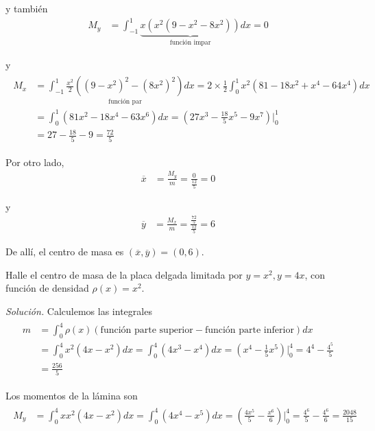 y también
\begin{align*}
M_{y}&=\int_{-1}^{1}\underset{\text{función impar}}{\underbrace{x\left(
x^{2}\left( 9-x^{2}-8x^{2}\right) \right) }}dx=0
\end{align*}

y
\begin{gather*}
\begin{aligned}
  M_{x}&=\int_{-1}^{1}\underset{\text{función par}}{\frac{x^{2}}{2}\left(
  \left( 9-x^{2}\right) ^{2}-\left( 8x^{2}\right) ^{2}\right) }dx=2\times \frac{1}{2}\int_{0}^{1}x^{2}\left( 81-18x^{2}+x^{4}-64x^{4}\right)dx\\
  &=\int_{0}^{1}\left( 81x^{2}-18x^{4}-63x^{6}\right) dx=\left( 27x^{3}-\frac{18}{5}x^{5}-9x^{7}\right)\Big\vert _{0}^{1}\\
  &=27-\frac{18}{5}-9=\frac{72}{5}
\end{aligned}
\end{gather*}

Por otro lado,
\begin{align*}
\overline{x}&=\frac{M_{y}}{m}=\frac{0}{\frac{12}{5}}=0
\end{align*}

y
\begin{align*}
\overline{y}&=\frac{M_{x}}{m}=\frac{\frac{72}{5}}{\frac{12}{5}}=6
\end{align*}

De allí, el centro de masa es $\left( \overline{x},\overline{y}\right) =\left( 0,6\right) $.

\begin{ejemplo}
Halle el centro de masa de la placa delgada limitada por $y=x^{2},y=4x$, con función de densidad $\rho \left( x\right) =x^{2}.$
\end{ejemplo}

\emph{Solución.} Calculemos las integrales
\begin{gather*}
\begin{aligned}
  m&=\int_{0}^{4}\rho \left( x\right) \left( \text{función parte superior}-\text{función parte inferior}\right) dx\\
  &=\int_{0}^{4}x^{2}\left( 4x-x^{2}\right) dx=\int_{0}^{4}\left( 4x^{3}-x^{4}\right) dx=\left( x^{4}-\frac{1}{5}x^{5}\right)\Bigg|_{0}^{4}=4^{4}-\frac{4^{5}}{5}\\
  &=\frac{256}{5}
\end{aligned}
\end{gather*}

Los momentos de la lámina son
\begin{gather*}
\begin{aligned}
  M_{y}&=\int_{0}^{4}xx^{2}\left( 4x-x^{2}\right) dx=\int_{0}^{4}\left( 4x^{4}-x^{5}\right) dx=\left( \frac{4x^{5}}{5}-\frac{x^{6}}{6}\right)\biggl| _{0}^{4}=\frac{4^{6}}{5}-\frac{4^{6}}{6}=\frac{2048}{15}
\end{aligned}
\end{gather*}

